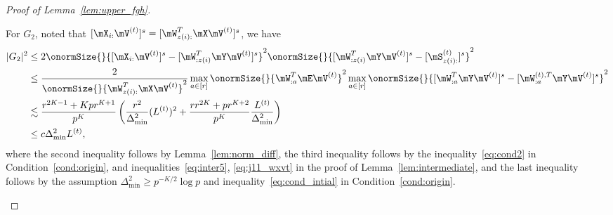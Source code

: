 \documentclass[lettersize,onecolumn,journal]{IEEEtran}
\theoremstyle{definition}
\theoremstyle{definition}
\newcommand{\of}[1]{\left(#1\right)}
\begin{document}
\begin{proof}[Proof of Lemma~\ref{lem:upper_fgh}]
\begin{enumerate}
    For $G_2$, noted that $[\mX_{i:} \mV^{(t)}]^s = [ \mW_{z(i):}^T\mX \mV^{(t)}]^s$, we have 
    \begin{align}
        |G_2|^2 &\leq 2\onormSize{}{ [\mX_{i:} \mV^{(t)}]^s  -  [  \mW_{:z(i)}^T \mY \mV^{(t)} ]^s}^2 \onormSize{}{ [  \mW_{:z(i)}^T \mY \mV^{(t)} ]^s -  [  \mS_{z(i):}^{(t)}  ]^s }^2 \\
        & \leq \frac{2}{ \onormSize{}{ \mW_{z(i):}^T\mX \mV^{(t)}}^2} \max_{a \in [r]}\onormSize{}{ \mW_{:a}^T \mE \mV^{(t)} }^2 \max_{a \in [r]} \onormSize{}{ [  \mW_{:a}^T \mY \mV^{(t)} ]^s -  [   \mW_{:a}^{(t),T} \mY \mV^{(t)}  ]^s}^2\\
        & \lesssim \frac{ r^{2K-1} + K p r^{K+1} }{p^{K}} \of{ \frac{r^2}{\Delta_{\min}^2} (L^{(t)})^2 + \frac{r r^{2K} + pr^{K+2}}{p^{K}} \frac{L^{(t)}}{\Delta_{\min}^2} }\\
        & \leq c \Delta_{\min}^2 L^{(t)},\label{eq:g2}
    \end{align}
    where the second inequality follows by Lemma~\ref{lem:norm_diff}, the third inequality follows by the inequality~\eqref{eq:cond2} in Condition~\ref{cond:origin}, and inequalities~\eqref{eq:inter5}, \eqref{eq:j11_wxvt} in the proof of Lemma~\ref{lem:intermediate},  and the last inequality follows by the assumption $\Delta_{\min}^2 \geq p^{-K/2} \log p$ and inequality~\eqref{eq:cond_intial} in Condition~\ref{cond:origin}.
    

\end{enumerate}
\end{proof}
\end{document}
